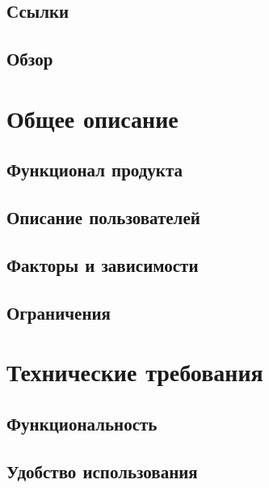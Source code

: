 \documentclass{article}
\begin{document}
  \subsection{Ссылки}
  

  \subsection{Обзор}
  

\section{Общее описание}

  \subsection{Функционал продукта}
  

  \subsection{Описание пользователей}
  

  \subsection{Факторы и зависимости}
  

  \subsection{Ограничения}
  

\section{Технические требования}

  \subsection{Функциональность}
  

  \subsection{Удобство использования}
  
\end{document}
